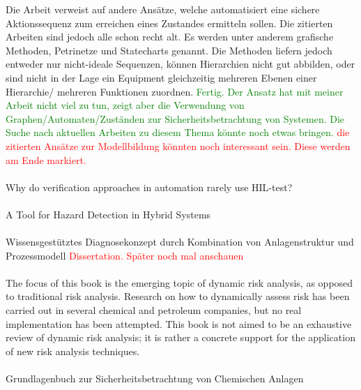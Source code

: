 Die Arbeit verweist auf andere Ans\"atze, welche automatisiert eine sichere Aktionssequenz zum erreichen eines Zustandes ermitteln sollen. Die zitierten Arbeiten sind jedoch alle schon recht alt. Es werden unter anderem grafische Methoden, Petrinetze und Statecharts genannt. Die Methoden liefern jedoch entweder nur nicht-ideale Sequenzen, k\"onnen Hierarchien nicht gut abbilden, oder sind nicht in der Lage ein Equipment gleichzeitig mehreren Ebenen einer Hierarchie/ mehreren Funktionen zuordnen.   \textcolor{green}{Fertig. Der Ansatz hat mit meiner Arbeit nicht viel zu tun, zeigt aber die Verwendung von Graphen/Automaten/Zust\"anden zur Sicherheitsbetrachtung von Systemen. Die Suche nach aktuellen Arbeiten zu diesem Thema k\"onnte noch etwas bringen.} \textcolor{red}{die zitierten Ans\"atze zur Modellbildung k\"onnten noch interessant sein. Diese werden am Ende markiert.}  

\paragraph*{\cite{Schetinin_2013}} Why do verification approaches in automation rarely use {HIL}-test?

\paragraph*{\cite{Herrmann_2000}} A Tool for Hazard Detection in Hybrid Systems

\paragraph*{\cite{Christiansen_2015}} Wissensgest{\"u}tztes Diagnosekonzept durch Kombination von Anlagenstruktur und Prozessmodell
\textcolor{red}{Dissertation. Sp\"ater noch mal anschauen}

\paragraph*{\cite{Paltrinieri_2016}}The focus of this book is the emerging topic of dynamic risk analysis, as opposed to traditional risk analysis. Research on how to dynamically assess risk has been carried out in several chemical and petroleum companies, but no real implementation has been attempted. This book is not aimed to be an exhaustive review of dynamic risk analysis; it is rather a concrete support for the application of new risk analysis techniques.

\paragraph*{\cite{Weber_2015}} Grundlagenbuch zur Sicherheitsbetrachtung von Chemischen Anlagen
